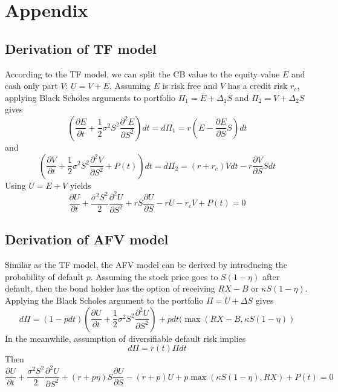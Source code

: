 \documentclass[12pt]{article}
\begin{document}
\section{Appendix}
\subsection{Derivation of TF model}
According to the TF model, we can split the CB value to the equity value $E$ and cash only part $V$: $U = V + E$. Assuming $E$ is risk free and $V$ has a credit risk $r_c$, applying Black Scholes arguments to portfolio $\Pi_1 = E + \Delta_1 S$ and $\Pi_2 = V + \Delta_2 S$ gives
\begin{equation*}
(\frac{\partial E}{\partial t} + \frac{1}{2}\sigma^2S^2\frac{\partial^2E}{\partial S^2})dt = d\Pi_1 = r(E - \frac{\partial E}{\partial S}S)dt
\end{equation*}
and
\begin{equation*}
(\frac{\partial V}{\partial t} + \frac{1}{2}\sigma^2S^2\frac{\partial^2V}{\partial S^2} + P(t))dt = d\Pi_2 = (r+r_c)Vdt - r\frac{\partial V}{\partial S}Sdt
\end{equation*}
Using $U = E + V$ yields
\begin{equation*}
\frac{\partial{U}}{\partial{t}} + 
\frac{\sigma^2S^2}{2}\frac{\partial^2{U}}{\partial{S}^2} + rS\frac{\partial{U}}{\partial{S}} - rU - r_cV + P(t) = 0 
\end{equation*}
\subsection{Derivation of AFV model}
Similar as the TF model, the AFV model can be derived by introducing the probability of default $p$. Assuming the stock price goes to $S(1-\eta)$ after default, then the bond holder has the option of receiving $RX-B$ or $\kappa S(1-\eta)$. Applying the Black Scholes argument to the portfolio $\Pi = U + \Delta S$ gives
\begin{equation*}
d\Pi = (1-pdt)(\frac{\partial U}{\partial t} + \frac{1}{2}\sigma^2S^2\frac{\partial^2U}{\partial S^2}) + pdt(\max(RX - B, \kappa S(1-\eta))
\end{equation*}
In the meanwhile, assumption of diversifiable default risk implies
\begin{equation*}
d\Pi = r(t)\Pi dt
\end{equation*}
Then
\begin{equation*}
\frac{\partial{U}}{\partial{t}} + 
\frac{\sigma^2S^2}{2}\frac{\partial^2{U}}{\partial{S}^2} + (r + p\eta)S\frac{\partial{U}}{\partial{S}} - (r+p)U + p\max(\kappa S(1-\eta), RX) + P(t) = 0 
\end{equation*}
\end{document}
